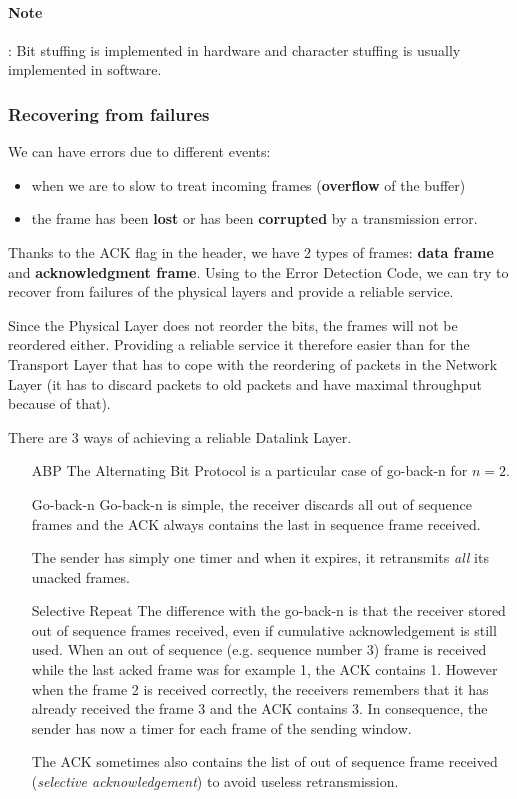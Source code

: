 \paragraph{Note} : Bit stuffing is implemented in hardware and character stuffing is usually
implemented in software.

\subsubsection{Recovering from failures}
We can have errors due to different events:
\begin{itemize}
  \item when we are to slow to treat incoming frames (\textbf{overflow} of the buffer)
  \item the frame has been \textbf{lost} or has been \textbf{corrupted}
    by a transmission error.
\end{itemize}

Thanks to the ACK flag in the header,
we have 2 types of frames: \textbf{data frame} and \textbf{acknowledgment frame}.
Using to the Error Detection Code,
we can try to recover from failures of the physical layers
and provide a reliable service.

Since the Physical Layer does not reorder the bits,
the frames will not be reordered either.
Providing a reliable service it therefore easier than for the Transport Layer that has to cope with the reordering of packets in the Network Layer (it has to discard packets to old packets and have maximal throughput because of that).

There are 3 ways of achieving a reliable Datalink Layer.
\begin{enumerate}
  \item[ABP]
    The Alternating Bit Protocol is
    a particular case of go-back-n for $n = 2$.
  \item[Go-back-n]
    Go-back-n is simple, the receiver discards all out of sequence frames
    and the ACK always contains the last in sequence frame received.

    The sender has simply one timer and when it expires, it retransmits \emph{all}
    its unacked frames.
  \item[Selective Repeat]
    The difference with the go-back-n is that the receiver stored out of sequence frames received,
    even if cumulative acknowledgement is still used.
    When an out of sequence (e.g. sequence number 3) frame is received while the last acked frame was for example 1,
    the ACK contains 1.
    However when the frame 2 is received correctly, the receivers remembers that it has already received the frame 3
    and the ACK contains 3.
    In consequence, the sender has now a timer for each frame of the sending window.

    The ACK sometimes also contains the list of out of sequence frame received (\emph{selective acknowledgement})
    to avoid useless retransmission.
\end{enumerate}

